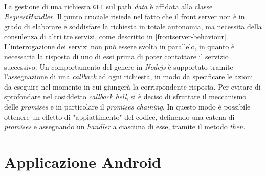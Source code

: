 \documentclass[a4paper,12pt]{report}
\begin{document}
La gestione di una richiesta \texttt{GET} sul path \emph{data} è affidata alla classe \emph{RequestHandler}. Il punto cruciale risiede nel fatto che il front server non è in grado di elaborare e soddisfare la richiesta in totale autonomia, ma necessita della consulenza di altri tre servizi, come descritto in \autoref{frontserver-behaviour}. L'interrogazione dei servizi non può essere svolta in parallelo, in quanto è necessaria la risposta di uno di essi prima di poter contattare il servizio successivo. Un comportamento del genere in \emph{Nodejs} è supportato tramite l'assegnazione di una \emph{callback} ad ogni richiesta, in modo da specificare le azioni da eseguire nel momento in cui giungerà la corrispondente risposta. Per evitare di sprofondare nel cosiddetto \emph{callback hell}, si è deciso di sfruttare il meccanismo delle \emph{promises} e in particolare il \emph{promises chaining}. In questo modo è possibile ottenere un effetto di "appiattimento" del codice, definendo una catena di \emph{promises} e assegnando un \emph{handler} a ciascuna di esse, tramite il metodo \emph{then}.


\section{Applicazione Android}
\end{document}
